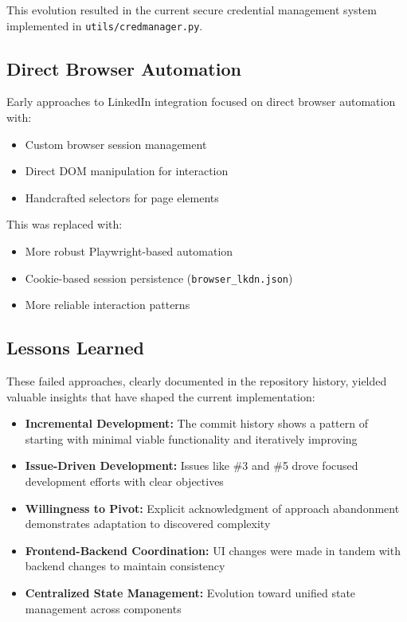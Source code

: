 \documentclass[a4paper,12pt]{article}
\begin{document}
This evolution resulted in the current secure credential management system implemented in \texttt{utils/credmanager.py}.

\subsection{Direct Browser Automation}

Early approaches to LinkedIn integration focused on direct browser automation with:

\begin{itemize}
    \item Custom browser session management
    \item Direct DOM manipulation for interaction
    \item Handcrafted selectors for page elements
\end{itemize}

This was replaced with:
\begin{itemize}
    \item More robust Playwright-based automation
    \item Cookie-based session persistence (\texttt{browser\_lkdn.json})
    \item More reliable interaction patterns
\end{itemize}

\subsection{Lessons Learned}

These failed approaches, clearly documented in the repository history, yielded valuable insights that have shaped the current implementation:

\begin{itemize}
    \item \textbf{Incremental Development:} The commit history shows a pattern of starting with minimal viable functionality and iteratively improving
    \item \textbf{Issue-Driven Development:} Issues like \#3 and \#5 drove focused development efforts with clear objectives
    \item \textbf{Willingness to Pivot:} Explicit acknowledgment of approach abandonment demonstrates adaptation to discovered complexity
    \item \textbf{Frontend-Backend Coordination:} UI changes were made in tandem with backend changes to maintain consistency
    \item \textbf{Centralized State Management:} Evolution toward unified state management across components
\end{itemize}
\end{document}
